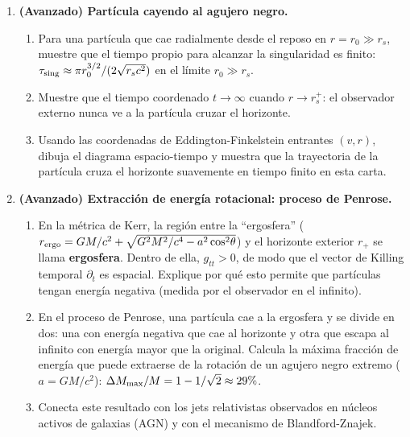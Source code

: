 \begin{enumerate}[leftmargin=2em, label=\textbf{P\thechapter.\arabic*.}]
  \item \textbf{(Avanzado) Partícula cayendo al agujero negro.}
  \begin{enumerate}[label=(\alph*)]
    \item Para una partícula que cae radialmente desde el reposo en $r = r_0 \gg r_s$, muestre que el tiempo propio para alcanzar la singularidad es finito: $\tau_{\rm sing} \approx \pi r_0^{3/2}/(2\sqrt{r_s c^2})$ en el límite $r_0 \gg r_s$.
    \item Muestre que el tiempo coordenado $t \to \infty$ cuando $r \to r_s^+$: el observador externo nunca ve a la partícula cruzar el horizonte.
    \item Usando las coordenadas de Eddington-Finkelstein entrantes $(v, r)$, dibuja el diagrama espacio-tiempo y muestra que la trayectoria de la partícula cruza el horizonte suavemente en tiempo finito en esta carta.
  \end{enumerate}

  \item \textbf{(Avanzado) Extracción de energía rotacional: proceso de Penrose.}
  \begin{enumerate}[label=(\alph*)]
    \item En la métrica de Kerr, la región entre la ``ergosfera'' ($r_{\rm ergo} = GM/c^2 + \sqrt{G^2M^2/c^4 - a^2\cos^2\!\theta}$) y el horizonte exterior $r_+$ se llama \textbf{ergosfera}. Dentro de ella, $g_{tt} > 0$, de modo que el vector de Killing temporal $\partial_t$ es espacial. Explique por qué esto permite que partículas tengan energía negativa (medida por el observador en el infinito).
    \item En el proceso de Penrose, una partícula cae a la ergosfera y se divide en dos: una con energía negativa que cae al horizonte y otra que escapa al infinito con energía mayor que la original. Calcula la máxima fracción de energía que puede extraerse de la rotación de un agujero negro extremo ($a = GM/c^2$): $\Delta M_{\rm max}/M = 1 - 1/\sqrt{2} \approx 29\%$.
    \item Conecta este resultado con los jets relativistas observados en núcleos activos de galaxias (AGN) y con el mecanismo de Blandford-Znajek.
  \end{enumerate}


\end{enumerate}
